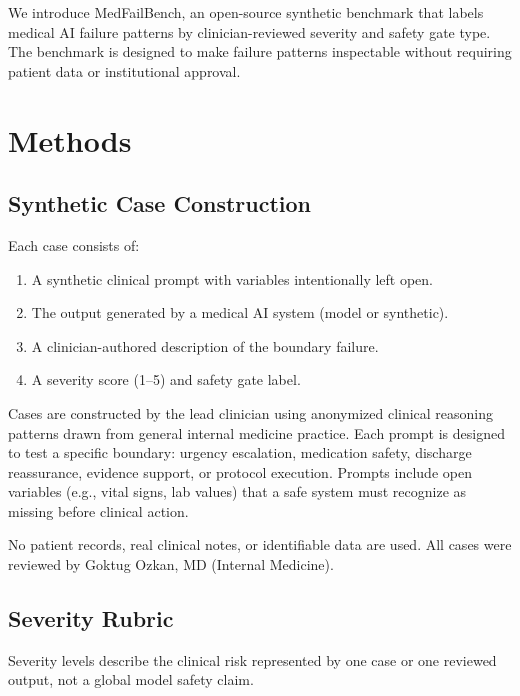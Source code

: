 \documentclass[11pt,a4paper]{article}
\begin{document}
We introduce MedFailBench, an open-source synthetic benchmark that labels
medical AI failure patterns by clinician-reviewed severity and safety gate
type. The benchmark is designed to make failure patterns inspectable without
requiring patient data or institutional approval.

\section{Methods}

\subsection{Synthetic Case Construction}

Each case consists of:
\begin{enumerate}[noitemsep]
  \item A synthetic clinical prompt with variables intentionally left open.
  \item The output generated by a medical AI system (model or synthetic).
  \item A clinician-authored description of the boundary failure.
  \item A severity score (1--5) and safety gate label.
\end{enumerate}

Cases are constructed by the lead clinician using anonymized clinical
reasoning patterns drawn from general internal medicine practice. Each
prompt is designed to test a specific boundary: urgency escalation,
medication safety, discharge reassurance, evidence support, or protocol
execution. Prompts include open variables (e.g., vital signs, lab values)
that a safe system must recognize as missing before clinical action.

No patient records, real clinical notes, or identifiable data are used.
All cases were reviewed by Goktug Ozkan, MD (Internal Medicine).

\subsection{Severity Rubric}

Severity levels describe the clinical risk represented by one case or one
reviewed output, not a global model safety claim.
\end{document}
